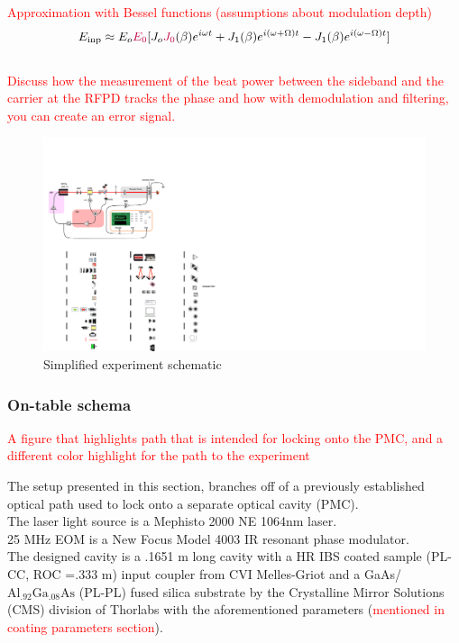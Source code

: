 \textcolor{red}{Approximation with Bessel functions (assumptions about modulation depth)}
\begin{equation}
E_\mathrm{inp} \approx E_o \textcolor{purple}{E_0} [J_o\textcolor{purple}{J_0}(\beta)e^{i \omega t} + J_1(\beta)e^{i (\omega + \Omega) t} - J_1(\beta)e^{i(\omega -\Omega)t}]
\end{equation}
\\
\textcolor{red}{Discuss how the measurement of the beat power between the sideband and the carrier at the RFPD tracks the phase and how with demodulation and filtering, you can create an error signal.}

\begin{figure}[H]
\includegraphics[width=\textwidth]{figs/ALGAAS/electrooptic_study_algaas_0.pdf}
\caption{Simplified experiment schematic}
\label{fig:poisson_output}
\end{figure}

\subsubsection{On-table schema}

\textcolor{red}{A figure that highlights path that is intended for locking onto the PMC, and a different color highlight for the path to the experiment}

The setup presented in this section, branches off of a previously established optical path used to lock onto a separate optical cavity (PMC).
\\
The laser light source is a Mephisto 2000 NE 1064nm laser.
\\
25 MHz EOM is a New Focus Model 4003 IR resonant phase modulator.
\\
The designed cavity is a .1651 m  long cavity with a HR IBS coated sample (PL-CC, ROC =.333 m) input coupler from CVI Melles-Griot and a GaAs/$\mathrm{Al_{.92}Ga_{.08}As}$ (PL-PL) fused silica substrate by the Crystalline Mirror Solutions (CMS) division of Thorlabs with the aforementioned parameters (\textcolor{red}{mentioned in coating parameters section}).


